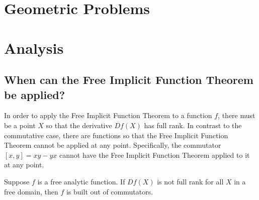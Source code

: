 \documentclass[oneside]{amsbook}
\numberwithin{equation}{section}
\begin{document}



\chapter{Geometric Problems}






















\chapter{Analysis}


\section{When can the Free Implicit Function Theorem be applied?}
In order to apply the Free Implicit Function Theorem to a function $f$, there must be a point $X$ so that the derivative $Df(X)$ has full rank.
In contrast to the commutative case, there are functions so that the Free Implicit Function Theorem cannot be applied at any point.
Specifically, the commutator $[x,y] = xy - yx$ cannot have the Free Implicit Function Theorem applied to it at any point.

\begin{conjecture}
	Suppose $f$ is a free analytic function.
	If $Df(X)$ is not full rank for all $X$ in a free domain, then $f$ is built out of commutators.
\end{conjecture}

%	
%	
%	
%
\end{document}
